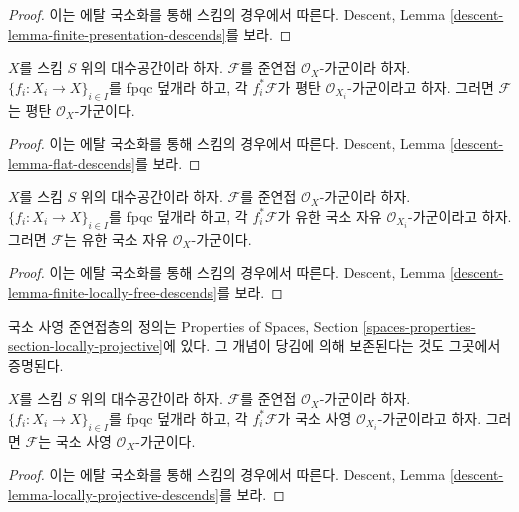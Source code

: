 \begin{proof}
이는 에탈 국소화를 통해 스킴의 경우에서 따른다. Descent, Lemma
\ref{descent-lemma-finite-presentation-descends}를 보라.
\end{proof}

\begin{lemma}
\label{lemma-flat-descends}
$X$를 스킴 $S$ 위의 대수공간이라 하자. $\mathcal{F}$를 준연접
$\mathcal{O}_X$-가군이라 하자. $\{f_i:X_i\to X\}_{i\in I}$를 fpqc
덮개라 하고, 각 $f_i^*\mathcal{F}$가 평탄
$\mathcal{O}_{X_i}$-가군이라고 하자. 그러면 $\mathcal{F}$는 평탄
$\mathcal{O}_X$-가군이다.
\end{lemma}

\begin{proof}
이는 에탈 국소화를 통해 스킴의 경우에서 따른다. Descent, Lemma
\ref{descent-lemma-flat-descends}를 보라.
\end{proof}

\begin{lemma}
\label{lemma-finite-locally-free-descends}
$X$를 스킴 $S$ 위의 대수공간이라 하자. $\mathcal{F}$를 준연접
$\mathcal{O}_X$-가군이라 하자. $\{f_i:X_i\to X\}_{i\in I}$를 fpqc
덮개라 하고, 각 $f_i^*\mathcal{F}$가 유한 국소 자유
$\mathcal{O}_{X_i}$-가군이라고 하자. 그러면 $\mathcal{F}$는 유한 국소
자유 $\mathcal{O}_X$-가군이다.
\end{lemma}

\begin{proof}
이는 에탈 국소화를 통해 스킴의 경우에서 따른다. Descent, Lemma
\ref{descent-lemma-finite-locally-free-descends}를 보라.
\end{proof}

\noindent
국소 사영 준연접층의 정의는 Properties of Spaces, Section
\ref{spaces-properties-section-locally-projective}에 있다. 그 개념이 당김에
의해 보존된다는 것도 그곳에서 증명된다.

\begin{lemma}
\label{lemma-locally-projective-descends}
$X$를 스킴 $S$ 위의 대수공간이라 하자. $\mathcal{F}$를 준연접
$\mathcal{O}_X$-가군이라 하자. $\{f_i:X_i\to X\}_{i\in I}$를 fpqc
덮개라 하고, 각 $f_i^*\mathcal{F}$가 국소 사영
$\mathcal{O}_{X_i}$-가군이라고 하자. 그러면 $\mathcal{F}$는 국소 사영
$\mathcal{O}_X$-가군이다.
\end{lemma}

\begin{proof}
이는 에탈 국소화를 통해 스킴의 경우에서 따른다. Descent, Lemma
\ref{descent-lemma-locally-projective-descends}를 보라.
\end{proof}

